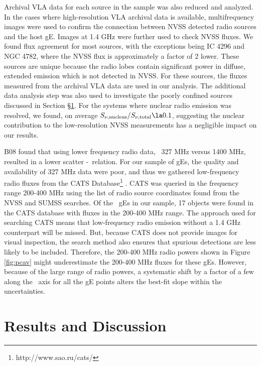 \documentclass{emulateapj}
\begin{document}
Archival VLA data for each source in the sample was also reduced and
analyzed. In the cases where high-resolution VLA archival data is
available, multifrequency images were used to confirm the connection
between NVSS detected radio sources and the host gE. Images at 1.4 GHz
were further used to check NVSS fluxes. We found flux agreement for
most sources, with the exceptions being IC 4296 and NGC 4782, where
the NVSS flux is approximately a factor of 2 lower. These sources are
unique because the radio lobes contain significant power in diffuse,
extended emission which is not detected in NVSS. For these sources,
the fluxes measured from the archival VLA data are used in our
analysis. The additional data analysis step was also used to
investigate the poorly confined sources discussed in Section
\S\ref{sec:r&d}. For the systems where nuclear radio emission was
resolved, we found, on average $S_{\nu,\mathrm{nucleus}} /
S_{\nu,\mathrm{total}} \la 0.1$, suggesting the nuclear contribution
to the low-resolution NVSS measurements has a negligible impact on our
results.

B08 found that using lower frequency radio data, \ie\ 327 MHz versus
1400 MHz, resulted in a lower scatter \pcav-\prad\ relation. For our
sample of gEs, the quality and availability of 327 MHz data were poor,
and thus we gathered low-frequency radio fluxes from the CATS
Database\footnote{http://www.sao.ru/cats/} \citep{cats}. CATS was
queried in the frequency range 200-400 MHz using the list of radio
source coordinates found from the NVSS and SUMSS searches. Of the
\samp\ gEs in our sample, 17 objects were found in the CATS database
with fluxes in the 200-400 MHz range. The approach used for searching
CATS means that low-frequency radio emission without a 1.4 GHz
counterpart will be missed. But, because CATS does not provide images
for visual inspection, the search method also ensures that spurious
detections are less likely to be included. Therefore, the 200-400 MHz
radio powers shown in Figure \ref{fig:pcav} might underestimate the
200-400 MHz fluxes for these gEs. However, because of the large range
of radio powers, a systematic shift by a factor of a few along the
\prad\ axis for all the gE points alters the best-fit slope within the
uncertainties.

\section{Results and Discussion}
\label{sec:r&d}
\end{document}
